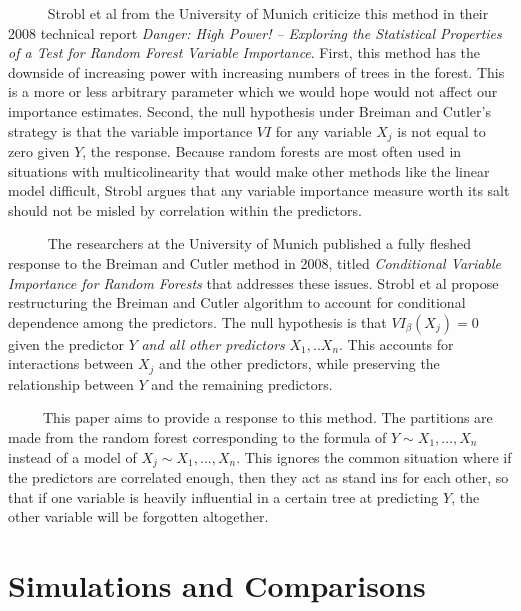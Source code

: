 \documentclass[12pt,twoside]{reedthesis}
\begin{document}
  ~~~~~ Strobl et al from the University of Munich criticize this method
  in their 2008 technical report \emph{Danger: High Power! -- Exploring
  the Statistical Properties of a Test for Random Forest Variable
  Importance}. First, this method has the downside of increasing power
  with increasing numbers of trees in the forest. This is a more or less
  arbitrary parameter which we would hope would not affect our importance
  estimates. Second, the null hypothesis under Breiman and Cutler's
  strategy is that the variable importance \(VI\) for any variable \(X_j\)
  is not equal to zero given \(Y\), the response. Because random forests
  are most often used in situations with multicolinearity that would make
  other methods like the linear model difficult, Strobl argues that any
  variable importance measure worth its salt should not be misled by
  correlation within the predictors.
  
  ~~~~~ The researchers at the University of Munich published a fully
  fleshed response to the Breiman and Cutler method in 2008, titled
  \emph{Conditional Variable Importance for Random Forests} that addresses
  these issues. Strobl et al propose restructuring the Breiman and Cutler
  algorithm to account for conditional dependence among the predictors.
  The null hypothesis is that \(VI_{\beta}(X_j) = 0\) given the predictor
  \(Y\) \emph{and all other predictors} \(X_1,..X_n\). This accounts for
  interactions between \(X_j\) and the other predictors, while preserving
  the relationship between \(Y\) and the remaining predictors.
  
  ~~~~~This paper aims to provide a response to this method. The
  partitions are made from the random forest corresponding to the formula
  of \(Y \sim X_1,...,X_n\) instead of a model of
  \(X_j \sim X_1,...,X_n\). This ignores the common situation where if the
  predictors are correlated enough, then they act as stand ins for each
  other, so that if one variable is heavily influential in a certain tree
  at predicting \(Y\), the other variable will be forgotten altogether.
  
  \chapter{Simulations and Comparisons}\label{simulations-and-comparisons}
  
\end{document}
